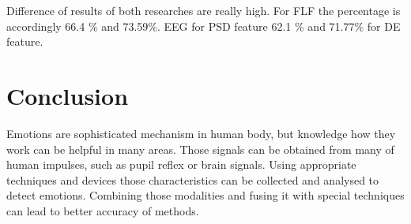 \documentclass[10pt,journal,compsoc,twoside]{IEEEtran}
\begin{document}
\begin{table}[ht]
\centering
\caption{ Performance in \% of using different multimodal features \cite{SoleymaniPanticPun2002}}
\label{table:result2}
\end{table}
Difference of results of both researches are really high. For FLF the percentage is  accordingly 66.4 \% and 73.59\%. EEG for PSD feature 62.1 \% and 71.77\% for DE feature.
\section{Conclusion}

Emotions are sophisticated mechanism in human body, but knowledge how they work can be helpful in many areas. Those signals can be obtained from many of human impulses, such as pupil reflex or brain signals. Using appropriate techniques and devices those characteristics can be collected and analysed to detect emotions. Combining those modalities and fusing it with special techniques can lead to better accuracy of methods.
	
\end{document}
